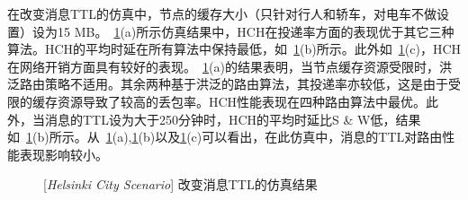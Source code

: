 在改变消息TTL的仿真中，节点的缓存大小（只针对行人和轿车，对电车不做设置）设为15 MB。\figurename~\ref{fig:chap5_helsinki_ttl}(a)所示仿真结果中，HCH在投递率方面的表现优于其它三种算法。HCH的平均时延在所有算法中保持最低，如\figurename~\ref{fig:chap5_helsinki_ttl}(b)所示。此外如\figurename~\ref{fig:chap5_helsinki_ttl}(c)，HCH在网络开销方面具有较好的表现。\figurename~\ref{fig:chap5_helsinki_ttl}(a)的结果表明，当节点缓存资源受限时，洪泛路由策略不适用。其余两种基于洪泛的路由算法，其投递率亦较低，这是由于受限的缓存资源导致了较高的丢包率。HCH性能表现在四种路由算法中最优。此外，当消息的TTL设为大于250分钟时，HCH的平均时延比S \& W低，结果如\figurename~\ref{fig:chap5_helsinki_ttl}(b)所示。从\figurename~\ref{fig:chap5_helsinki_ttl}(a),\ref{fig:chap5_helsinki_ttl}(b)以及\ref{fig:chap5_helsinki_ttl}(c)可以看出，在此仿真中，消息的TTL对路由性能表现影响较小。


\begin{figure}[tbp]
\centering
{}
\caption{[\emph{Helsinki City Scenario}] 改变消息TTL的仿真结果}
\label{fig:chap5_helsinki_ttl}
\end{figure}



